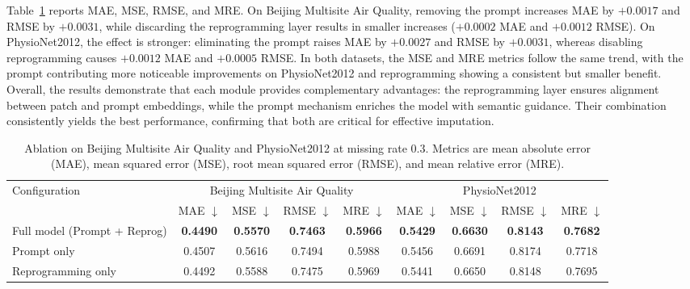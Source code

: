 \documentclass[conference]{IEEEtran}
\begin{document}
Table~\ref{tab:ablation} reports MAE, MSE, RMSE, and MRE. On Beijing Multisite Air Quality, removing the prompt increases MAE by $+0.0017$ and RMSE by $+0.0031$, while discarding the reprogramming layer results in smaller increases ($+0.0002$ MAE and $+0.0012$ RMSE). On PhysioNet2012, the effect is stronger: eliminating the prompt raises MAE by $+0.0027$ and RMSE by $+0.0031$, whereas disabling reprogramming causes $+0.0012$ MAE and $+0.0005$ RMSE. In both datasets, the MSE and MRE metrics follow the same trend, with the prompt contributing more noticeable improvements on PhysioNet2012 and reprogramming showing a consistent but smaller benefit.
Overall, the results demonstrate that each module provides complementary advantages: the reprogramming layer ensures alignment between patch and prompt embeddings, while the prompt mechanism enriches the model with semantic guidance. Their combination consistently yields the best performance, confirming that both are critical for effective imputation.

\begin{table}[!ht]
\centering
\caption{Ablation on Beijing Multisite Air Quality and PhysioNet2012 at missing rate $0.3$. Metrics are mean absolute error (MAE), mean squared error (MSE), root mean squared error (RMSE), and mean relative error (MRE).}
\label{tab:ablation}
\begin{tabular}{lcccccccc}
\toprule
\multirow{2}{*}{Configuration} & \multicolumn{4}{c}{Beijing Multisite Air Quality} & \multicolumn{4}{c}{PhysioNet2012} \\
\cmidrule(lr){2-5}\cmidrule(lr){6-9}
 & MAE $\downarrow$ & MSE $\downarrow$ & RMSE $\downarrow$ & MRE $\downarrow$ & MAE $\downarrow$ & MSE $\downarrow$ & RMSE $\downarrow$ & MRE $\downarrow$ \\
\midrule
Full model (Prompt + Reprog) & \textbf{0.4490} & \textbf{0.5570} & \textbf{0.7463} & \textbf{0.5966} & \textbf{0.5429} & \textbf{0.6630} & \textbf{0.8143} & \textbf{0.7682} \\
Prompt only                   & 0.4507 & 0.5616 & 0.7494 & 0.5988 & 0.5456 & 0.6691 & 0.8174 & 0.7718 \\
Reprogramming only            & 0.4492 & 0.5588 & 0.7475 & 0.5969 & 0.5441 & 0.6650 & 0.8148 & 0.7695 \\
\bottomrule
\end{tabular}
\end{table}

\end{document}
